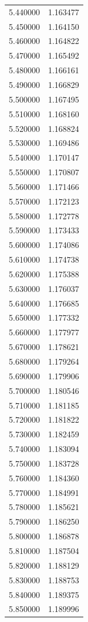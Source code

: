 \begin{tabular}{rr}
5.440000 & 1.163477 \\
5.450000 & 1.164150 \\
5.460000 & 1.164822 \\
5.470000 & 1.165492 \\
5.480000 & 1.166161 \\
5.490000 & 1.166829 \\
5.500000 & 1.167495 \\
5.510000 & 1.168160 \\
5.520000 & 1.168824 \\
5.530000 & 1.169486 \\
5.540000 & 1.170147 \\
5.550000 & 1.170807 \\
5.560000 & 1.171466 \\
5.570000 & 1.172123 \\
5.580000 & 1.172778 \\
5.590000 & 1.173433 \\
5.600000 & 1.174086 \\
5.610000 & 1.174738 \\
5.620000 & 1.175388 \\
5.630000 & 1.176037 \\
5.640000 & 1.176685 \\
5.650000 & 1.177332 \\
5.660000 & 1.177977 \\
5.670000 & 1.178621 \\
5.680000 & 1.179264 \\
5.690000 & 1.179906 \\
5.700000 & 1.180546 \\
5.710000 & 1.181185 \\
5.720000 & 1.181822 \\
5.730000 & 1.182459 \\
5.740000 & 1.183094 \\
5.750000 & 1.183728 \\
5.760000 & 1.184360 \\
5.770000 & 1.184991 \\
5.780000 & 1.185621 \\
5.790000 & 1.186250 \\
5.800000 & 1.186878 \\
5.810000 & 1.187504 \\
5.820000 & 1.188129 \\
5.830000 & 1.188753 \\
5.840000 & 1.189375 \\
5.850000 & 1.189996 \\

\end{tabular}
